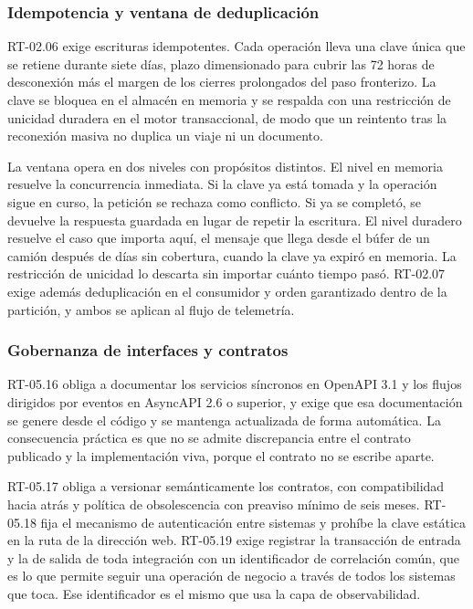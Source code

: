 \subsubsection{Idempotencia y ventana de deduplicación}

RT-02.06 exige escrituras idempotentes. Cada operación lleva una clave única que se retiene durante
siete días, plazo dimensionado para cubrir las 72 horas de desconexión más el margen de los cierres
prolongados del paso fronterizo. La clave se bloquea en el almacén en memoria y se respalda con una
restricción de unicidad duradera en el motor transaccional, de modo que un reintento tras la
reconexión masiva no duplica un viaje ni un documento.

La ventana opera en dos niveles con propósitos distintos. El nivel en memoria resuelve la
concurrencia inmediata. Si la clave ya está tomada y la operación sigue en curso, la petición se
rechaza como conflicto. Si ya se completó, se devuelve la respuesta guardada en lugar de repetir la
escritura. El nivel duradero resuelve el caso que importa aquí, el mensaje que llega desde el búfer
de un camión después de días sin cobertura, cuando la clave ya expiró en memoria. La restricción de
unicidad lo descarta sin importar cuánto tiempo pasó. RT-02.07 exige además deduplicación en el
consumidor y orden garantizado dentro de la partición, y ambos se aplican al flujo de telemetría.

\subsubsection{Gobernanza de interfaces y contratos}

RT-05.16 obliga a documentar los servicios síncronos en OpenAPI 3.1 y los flujos dirigidos por
eventos en AsyncAPI 2.6 o superior, y exige que esa documentación se genere desde el código y se
mantenga actualizada de forma automática. La consecuencia práctica es que no se admite discrepancia
entre el contrato publicado y la implementación viva, porque el contrato no se escribe aparte.

RT-05.17 obliga a versionar semánticamente los contratos, con compatibilidad hacia atrás y política
de obsolescencia con preaviso mínimo de seis meses. RT-05.18 fija el mecanismo de autenticación
entre sistemas y prohíbe la clave estática en la ruta de la dirección web. RT-05.19 exige registrar
la transacción de entrada y la de salida de toda integración con un identificador de correlación
común, que es lo que permite seguir una operación de negocio a través de todos los sistemas que
toca. Ese identificador es el mismo que usa la capa de observabilidad.

